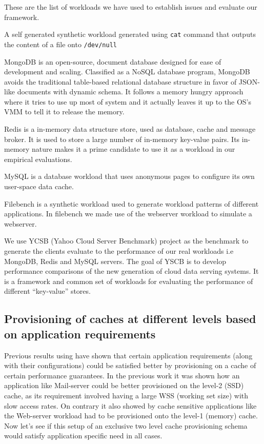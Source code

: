 	These are the list of workloads we have used to establish issues and evaluate our framework.
	  
	    A self generated synthetic workload generated using \texttt{cat} command that outputs the 
	    content of a file onto \texttt{/dev/null}
	  
	    MongoDB \cite{Mongodb} is an open-source, document database designed for ease of development and scaling. Classified as a NoSQL 
    database program, MongoDB avoids the traditional table-based relational database structure in favor of JSON-like documents with dynamic 
    schema. It follows a memory hungry approach where it tries to use up most of system and it actually leaves it up to the OS's VMM to tell it 
    to release the memory.

	    Redis \cite{redis} is a in-memory data structure store, used as database, cache and message broker. It is used to store a large 
    number of in-memory key-value pairs. Its in-memory nature makes it a prime candidate to use it as a workload in our empirical evaluations.
      
	    MySQL \cite{mysql} is a database workload that uses anonymous pages to configure its own user-space data cache. 
	    
	    Filebench \cite{filebench} is a synthetic workload used to generate workload patterns of different applications. In filebench we made
	    use of the webserver workload to simulate a webserver.
	  
      
	    We use YCSB \cite{cooper2010benchmarking} (Yahoo Cloud Server Benchmark) project as the benchmark to generate the clients evaluate 
    to the performance of our real workloads i.e MongoDB, Redis and MySQL servers. The goal of YSCB is to develop performance comparisons of the new 
    generation of cloud data serving systems. It is a framework and common set of workloads for evaluating the performance of different 
    “key-value” stores.
  
    \subsection{Provisioning of caches at different levels based on application requirements}
    
      Previous results using \dd{}\cite{doubledecker} have shown that certain application requirements 
      (along with their configurations) could be satisfied better by provisioning on a cache of certain 
      performance guarantees. In the previous work\cite{doubledecker} it was shown how an application like 
      Mail-server could be better provisioned on the level-2 (SSD) cache, as its requirement involved 
      having a large WSS (working set size) with slow access rates. On contrary it also showed by cache sensitive 
      applications like the Web-server workload had to be provisioned onto the level-1 (memory) cache. 
      Now let's see if this setup of an exclusive two level cache provisioning schema would satisfy application
      specific need in all cases.
	
